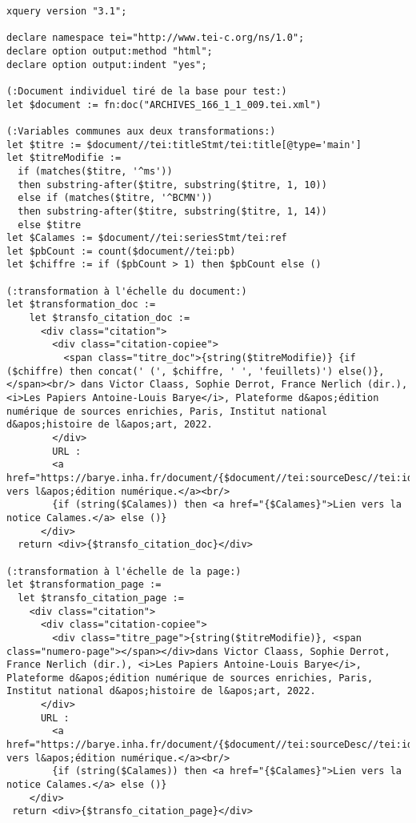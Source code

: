 \begin{verbatim}
xquery version "3.1";

declare namespace tei="http://www.tei-c.org/ns/1.0";
declare option output:method "html";
declare option output:indent "yes";

(:Document individuel tiré de la base pour test:)
let $document := fn:doc("ARCHIVES_166_1_1_009.tei.xml")

(:Variables communes aux deux transformations:)
let $titre := $document//tei:titleStmt/tei:title[@type='main']
let $titreModifie :=
  if (matches($titre, '^ms'))
  then substring-after($titre, substring($titre, 1, 10))
  else if (matches($titre, '^BCMN'))
  then substring-after($titre, substring($titre, 1, 14))
  else $titre
let $Calames := $document//tei:seriesStmt/tei:ref
let $pbCount := count($document//tei:pb)
let $chiffre := if ($pbCount > 1) then $pbCount else ()

(:transformation à l'échelle du document:)
let $transformation_doc :=          
    let $transfo_citation_doc :=
      <div class="citation">
        <div class="citation-copiee">
          <span class="titre_doc">{string($titreModifie)} {if ($chiffre) then concat(' (', $chiffre, ' ', 'feuillets)') else()},</span><br/> dans Victor Claass, Sophie Derrot, France Nerlich (dir.), <i>Les Papiers Antoine-Louis Barye</i>, Plateforme d&apos;édition numérique de sources enrichies, Paris, Institut national d&apos;histoire de l&apos;art, 2022.
        </div>
        URL :
        <a href="https://barye.inha.fr/document/{$document//tei:sourceDesc//tei:idno}">Lien vers l&apos;édition numérique.</a><br/>
        {if (string($Calames)) then <a href="{$Calames}">Lien vers la notice Calames.</a> else ()}
      </div>
  return <div>{$transfo_citation_doc}</div>
  
(:transformation à l'échelle de la page:)
let $transformation_page :=  
  let $transfo_citation_page :=
    <div class="citation">
      <div class="citation-copiee">
        <div class="titre_page">{string($titreModifie)}, <span class="numero-page"></span></div>dans Victor Claass, Sophie Derrot, France Nerlich (dir.), <i>Les Papiers Antoine-Louis Barye</i>, Plateforme d&apos;édition numérique de sources enrichies, Paris, Institut national d&apos;histoire de l&apos;art, 2022.
      </div>
      URL :
        <a href="https://barye.inha.fr/document/{$document//tei:sourceDesc//tei:idno}">Lien vers l&apos;édition numérique.</a><br/>
        {if (string($Calames)) then <a href="{$Calames}">Lien vers la notice Calames.</a> else ()}      
    </div>
 return <div>{$transfo_citation_page}</div>
 

\end{verbatim}
